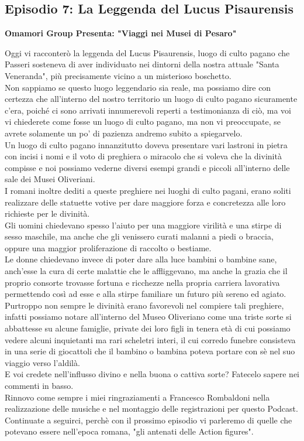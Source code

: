 \documentclass[hidelinks,12pt,a4paper]{article}
\begin{document}
\begin{flushleft}
		\subsection{Episodio 7: La Leggenda del Lucus Pisaurensis}
		\begin{center}
			\textbf{Omamori Group Presenta: "Viaggi nei Musei di Pesaro"}
		\end{center}
		Oggi vi racconterò la leggenda del Lucus Pisaurensis, luogo di culto pagano che Passeri sosteneva di aver individuato nei dintorni della nostra attuale "Santa Veneranda", più precisamente vicino a un misterioso boschetto.\\
		Non sappiamo se questo luogo leggendario sia reale, ma possiamo dire con certezza che all'interno del nostro territorio un luogo di culto pagano sicuramente c'era, poiché ci sono arrivati innumerevoli reperti a testimonianza di ciò, ma voi vi chiederete come fosse un luogo di culto pagano, ma non vi preoccupate, se avrete solamente un po' di pazienza andremo subito a spiegarvelo.\\
		Un luogo di culto pagano innanzitutto doveva presentare vari lastroni in pietra con incisi i nomi e il voto di preghiera o miracolo che si voleva che la divinità compisse e noi possiamo vederne diversi esempi grandi e piccoli all'interno delle sale dei Musei Oliveriani.\\
		I romani inoltre dediti a queste preghiere nei luoghi di culto pagani, erano soliti realizzare delle statuette votive per dare maggiore forza e concretezza alle loro richieste per le divinità.\\ 
		Gli uomini chiedevano spesso l'aiuto per una maggiore virilità e una stirpe di sesso maschile, ma anche che gli venissero curati malanni a piedi o braccia, oppure una maggior proliferazione di raccolto o bestiame.\\
		Le donne chiedevano invece di poter dare alla luce bambini o bambine sane, anch'esse la cura di certe malattie che le affliggevano, ma anche la grazia che il proprio consorte trovasse fortuna e ricchezze nella propria carriera lavorativa permettendo così ad esse e alla stirpe familiare un futuro più sereno ed agiato.\\
		Purtroppo non sempre le divinità erano favorevoli nel compiere tali preghiere, infatti possiamo notare all'interno del Museo Oliveriano come una triste sorte si abbattesse su alcune famiglie, private dei loro figli in tenera età di cui possiamo vedere alcuni inquietanti ma rari scheletri interi, il cui corredo funebre consisteva in una serie di giocattoli che il bambino o bambina poteva portare con sè nel suo viaggio verso l'aldilà.\\
		E voi credete nell'influsso divino e nella buona o cattiva sorte? Fatecelo sapere nei commenti in basso.\\
		Rinnovo come sempre i miei ringraziamenti a Francesco Rombaldoni nella realizzazione delle musiche e nel montaggio delle registrazioni per questo Podcast.\\
		Continuate a seguirci, perchè con il prossimo episodio vi parleremo di quelle che potevano essere nell'epoca romana, "gli antenati delle Action figures".\\
		

\end{flushleft}
\end{document}
